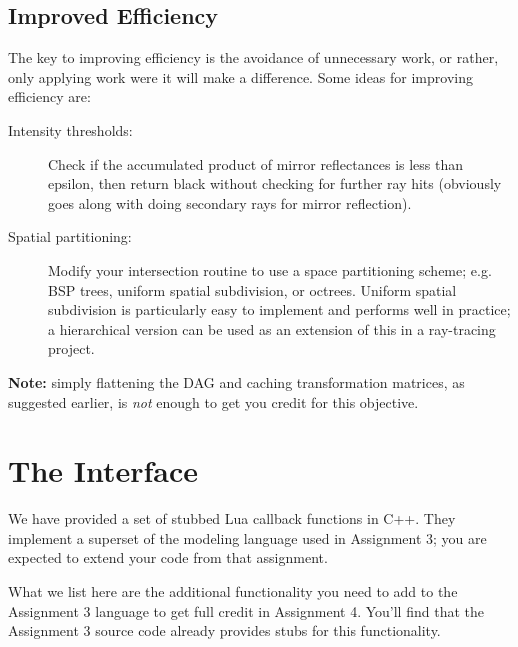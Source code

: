 \subsection{Improved Efficiency}
The key to improving efficiency is the avoidance of unnecessary work,
or rather, only applying work were it will make a difference.
Some ideas for improving efficiency are:
\begin{description}
\item[Intensity thresholds:] Check if the accumulated product of mirror
    reflectances is less than epsilon, then return black without 
    checking for further ray hits (obviously goes along with doing 
    secondary rays for mirror reflection).
\item[Spatial partitioning:] Modify your intersection routine to use
    a space partitioning scheme; e.g. BSP trees, uniform spatial subdivision, 
    or octrees.  Uniform spatial subdivision is particularly
    easy to implement and performs well in practice; a hierarchical
    version can be used as an extension of this in a ray-tracing
    project.
\end{description}

{\bf Note:} simply flattening the DAG and caching transformation 
matrices, as suggested
earlier, is {\em not} enough to get you credit for this objective.

\section{The Interface} 
We have provided a set of stubbed Lua callback functions in C++. 
They implement a superset of the modeling language used in 
Assignment 3; you are expected to extend your code from that assignment.

What we list here are the additional functionality you need to add to the
Assignment 3 language to get full credit in Assignment 4.  You'll 
find that the Assignment 3 source code already provides stubs for this
functionality.

